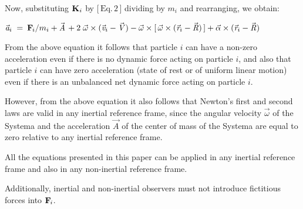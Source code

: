 \documentclass[10pt]{article}
\begin{document}
\par \bigskip \noindent Now, substituting ${\mathbf{K}}_{\hspace{+0.009em}i}$ by \hyperlink{e1p2}{$\big[\,{\mathrm{Eq.\,2}}\,\big]$} dividing by $m_i$ and rearranging, we obtain:

\par \bigskip ${\vec{\mathit{a}}}_{i} \;=\: {\mathbf{F}}_{\hspace{-0.09em}i}/m_i + {\vec{\mathit{A}}} \hspace{+0.15em} + 2 \; {\vec{\omega}} \times ({\vec{\mathit{v}}}_{i} - {\vec{\mathit{V}}}) - {\vec{\omega}} \times [ \, {\vec{\omega}} \times ({\vec{\mathit{r}}}_{i} - {\vec{\mathit{R}}}) \, ] + {\vec{\alpha}} \times ({\vec{\mathit{r}}}_{i} - {\vec{\mathit{R}}})$

\par \bigskip \noindent From the above equation it follows that particle $i$ can have a non-zero acceleration even if there is no dynamic force acting on particle $i$, and also that particle $i$ can have zero acceleration (state of rest or of uniform linear motion) even if there is an unbalanced net dynamic force acting on particle $i$.

\par \bigskip \noindent However, from the above equation it also follows that Newton's first and second laws are valid in any inertial reference frame, since the angular velocity ${\vec{\omega}}$ of the Systema and the acceleration ${\vec{\mathit{A}}}$ of the center of mass of the Systema are equal to zero relative to any inertial reference frame.

\vspace{+0.60em}

\par {}

\par \bigskip \noindent All the equations presented in this paper can be applied in any inertial reference frame and also in any non-inertial reference frame.

\par \bigskip \noindent Additionally, inertial and non-inertial observers must not introduce fictitious forces into ${\mathbf{F}}_{\hspace{-0.09em}i}$.
\end{document}
